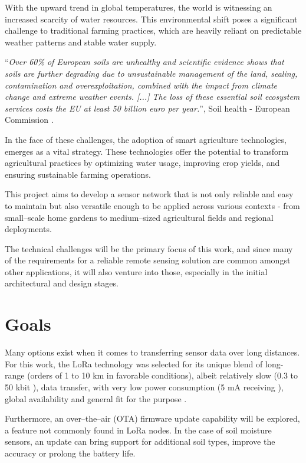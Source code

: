 
With the upward trend in global temperatures, the world is witnessing an increased scarcity of water resources. This environmental shift poses a significant challenge to traditional farming practices, which are heavily reliant on predictable weather patterns and stable water supply. 

``\emph{Over 60\% of European soils are unhealthy and scientific evidence shows that soils are further degrading due to unsustainable management of the land, sealing, contamination and overexploitation, combined with the impact from climate change and extreme weather events. [...] The loss of these essential soil ecosystem services costs the EU at least 50 billion euro per year.}'', Soil health - European Commission \cite{european_commission_soil_2024}.

In the face of these challenges, the adoption of smart agriculture technologies, emerges as a vital strategy. These technologies offer the potential to transform agricultural practices by optimizing water usage, improving crop yields, and ensuring sustainable farming operations.

This project aims to develop a sensor network that is not only reliable and easy to maintain but also versatile enough to be applied across various contexts - from small--scale home gardens to medium--sized agricultural fields and regional deployments. 

The technical challenges will be the primary focus of this work, and since many of the requirements for a reliable remote sensing solution are common amongst other applications, it will also venture into those, especially in the initial architectural and design stages. 

\section{Goals}
Many options exist when it comes to transferring sensor data over long distances. For this work, the LoRa technology \cite{semtech_corporation_sx12612_2024,stmicroelectronics_lora_2024} was selected for its unique blend of long-range (orders of 1 to 10 km in favorable conditions), albeit relatively slow (0.3 to 50 kbit \cite{semtech_corporation_sx12612_2024}), data transfer, with very low power consumption (5 mA receiving \cite{semtech_corporation_sx12612_2024}), global availability and general fit for the purpose \cite{the_things_network_things_nodate}.

Furthermore, an over--the--air (OTA) firmware update capability will be explored, a feature not commonly found in LoRa nodes. In the case of soil moisture sensors, an update can bring support for additional soil types, improve the accuracy or prolong the battery life. 

